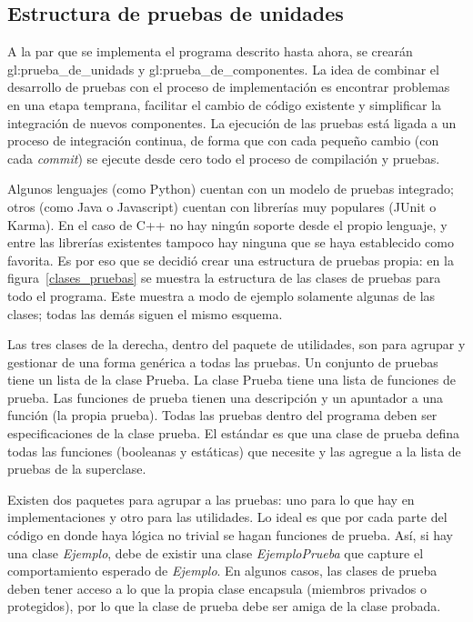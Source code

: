 %
%
%

\subsection{Estructura de pruebas de unidades}

A la par que se implementa el programa descrito hasta ahora, se crearán
\glspl{gl:prueba_de_unidad} y \glspl{gl:prueba_de_componente}. La idea de
combinar el desarrollo de pruebas con el proceso de implementación es encontrar
problemas en una etapa temprana, facilitar el cambio de código existente y
simplificar la integración de nuevos componentes. La ejecución de las pruebas
está ligada a un proceso de integración continua, de forma que con
cada pequeño cambio (con cada \textit{commit}) se ejecute desde cero todo el
proceso de compilación y pruebas.

Algunos lenguajes (como Python) cuentan con un modelo de pruebas integrado;
otros (como Java o Javascript) cuentan con librerías muy populares (JUnit o
Karma). En el caso de C++ no hay ningún soporte desde el propio lenguaje, y
entre las librerías existentes tampoco hay ninguna que se haya establecido como
favorita. Es por eso que se decidió crear una estructura de pruebas propia:
en la figura~\ref{clases_pruebas} se muestra la estructura de las clases de
pruebas para todo el programa. Este muestra a modo de ejemplo solamente algunas
de las clases; todas las demás siguen el mismo esquema.

Las tres clases de la derecha, dentro del paquete de utilidades, son para
agrupar y gestionar de una forma genérica a todas las pruebas. Un conjunto de
pruebas tiene un lista de la clase Prueba. La clase Prueba tiene una lista de
funciones de prueba. Las funciones de prueba tienen una descripción y un
apuntador a una función (la propia prueba). Todas las pruebas dentro del
programa deben ser especificaciones de la clase prueba. El estándar es que una
clase de prueba defina todas las funciones (booleanas y estáticas) que necesite
y las agregue a la lista de pruebas de la superclase.

Existen dos paquetes para agrupar a las pruebas: uno para lo que hay en
implementaciones y otro para las utilidades. Lo ideal es que por cada parte del
código en donde haya lógica no trivial se hagan funciones de prueba. Así, si hay
una clase \textit{Ejemplo}, debe de existir una clase \textit{EjemploPrueba}
que capture el comportamiento esperado de \textit{Ejemplo}. En algunos casos,
las clases de prueba deben tener acceso a lo que la propia clase encapsula
(miembros privados o protegidos), por lo que la clase de prueba debe ser amiga
de la clase probada.

